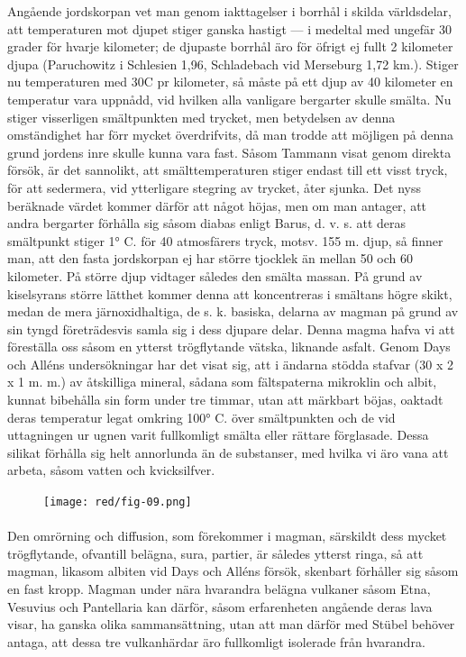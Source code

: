 \documentclass[a4paper, 12pt, oneside, swedish]{article}
\begin{document}
Angående jordskorpan vet man genom iakttagelser i borrhål i skilda världsdelar, att temperaturen mot djupet stiger ganska hastigt --- i medeltal med ungefär 30 grader för hvarje kilometer; de djupaste borrhål äro för öfrigt ej fullt 2 kilometer djupa (Paruchowitz i Schlesien 1,96, Schladebach vid Merseburg 1,72 km.). Stiger nu temperaturen med 30C pr kilometer, så måste på ett djup av 40 kilometer en temperatur vara uppnådd, vid hvilken alla vanligare bergarter skulle smälta. Nu stiger visserligen smältpunkten med trycket, men betydelsen av denna omständighet har förr mycket överdrifvits, då man trodde att möjligen på denna grund jordens inre skulle kunna vara fast. Såsom Tammann visat genom direkta försök, är det sannolikt, att smälttemperaturen stiger endast till ett visst tryck, för att sedermera, vid ytterligare stegring av trycket, åter sjunka. Det nyss beräknade värdet kommer därför att något höjas, men om man antager, att andra bergarter förhålla sig såsom diabas enligt Barus, d. v. s. att deras smältpunkt stiger 1° C. för 40 atmosfärers tryck, motsv. 155 m. djup, så finner man, att den fasta jordskorpan ej har större tjocklek än mellan 50 och 60 kilometer. På större djup vidtager således den smälta massan. På grund av kiselsyrans större lätthet kommer denna att koncentreras i smältans högre skikt, medan de mera järnoxidhaltiga, de s. k. basiska, delarna av magman på grund av sin tyngd företrädesvis samla sig i dess djupare delar. Denna magma hafva vi att föreställa oss såsom en ytterst trögflytande vätska, liknande asfalt. Genom Days och Alléns undersökningar har det visat sig, att i ändarna stödda stafvar (30 x 2 x 1 m. m.) av åtskilliga mineral, sådana som fältspaterna mikroklin och albit, kunnat bibehålla sin form under tre timmar, utan att märkbart böjas, oaktadt deras temperatur legat omkring 100° C. över smältpunkten och de vid uttagningen ur ugnen varit fullkomligt smälta eller rättare förglasade. Dessa silikat förhålla sig helt annorlunda än de substanser, med hvilka vi äro vana att arbeta, såsom vatten och kvicksilfver.

\begin{figure}[H]
\centering
\texttt{[image: red/fig-09.png]}
\caption{}
\end{figure}
\paragraph{}
Den omrörning och diffusion, som förekommer i magman, särskildt dess mycket trögflytande, ofvantill belägna, sura, partier, är således ytterst ringa, så att magman, likasom albiten vid Days och Alléns försök, skenbart förhåller sig såsom en fast kropp. Magman under nära hvarandra belägna vulkaner såsom Etna, Vesuvius och Pantellaria kan därför, såsom erfarenheten angående deras lava visar, ha ganska olika sammansättning, utan att man därför med Stübel behöver antaga, att dessa tre vulkanhärdar äro fullkomligt isolerade från hvarandra.
\end{document}
